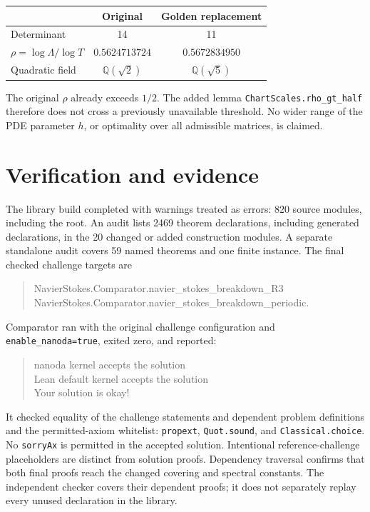 \documentclass[10pt]{article}
\begin{document}
\begin{center}
\begin{tabular}{lcc}
\toprule
 & Original & Golden replacement\\
\midrule
Determinant & 14 & 11\\
$\rho=\log\Lambda/\log T$ & $0.5624713724$ & $0.5672834950$\\
Quadratic field & $\mathbb Q(\sqrt2)$ & $\mathbb Q(\sqrt5)$\\
\bottomrule
\end{tabular}
\end{center}
The original $\rho$ already exceeds $1/2$. The added lemma
\texttt{ChartScales.rho\_gt\_half} therefore does not cross a previously
unavailable threshold. No wider range of the PDE parameter $h$, or optimality
over all admissible matrices, is claimed.

\section*{Verification and evidence}
The library build completed with warnings treated as errors: 820 source
modules, including the root. An audit lists 2469 theorem declarations,
including generated declarations, in the 20 changed or added construction
modules. A separate standalone audit covers 59 named theorems and one finite
instance. The final checked challenge targets are
\begin{quote}\small\ttfamily
NavierStokes.Comparator.navier\_stokes\_breakdown\_R3\\
NavierStokes.Comparator.navier\_stokes\_breakdown\_periodic.
\end{quote}
Comparator ran with the original challenge configuration and
\texttt{enable\_nanoda=true}, exited zero, and reported:
\begin{quote}\small\ttfamily
nanoda kernel accepts the solution\\
Lean default kernel accepts the solution\\
Your solution is okay!
\end{quote}
It checked equality of the challenge statements and dependent problem
definitions and the permitted-axiom whitelist: \texttt{propext},
\texttt{Quot.sound}, and \texttt{Classical.choice}. No \texttt{sorryAx}
is permitted in the accepted solution. Intentional reference-challenge
placeholders are distinct from solution proofs. Dependency traversal confirms
that both final proofs reach the changed covering and spectral constants.
The independent checker covers their dependent proofs; it does not separately
replay every unused declaration in the library.
\end{document}
